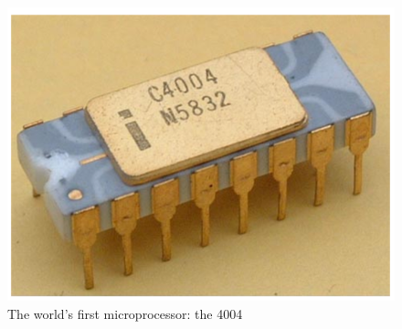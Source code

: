 \begin{figure}
    \begin{minipage}{0.65\linewidth}
        \includegraphics[width=1.0\columnwidth]{./Figure/Outline_4004.png}
        \caption[The world’s first microprocessor: the 4004]{The world’s first microprocessor: the 4004\protect\footnotemark[1]}
        \label{fig:Outline_4004}
    \end{minipage}
    \hspace{0.05\columnwidth}
    \begin{minipage}{0.35\linewidth}

\end{minipage}
\end{figure}
